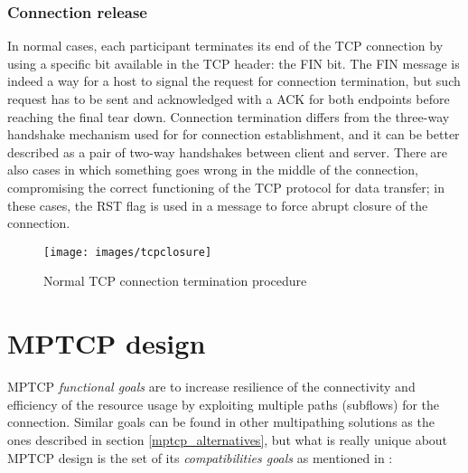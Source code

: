 \subsubsection{Connection release}
In normal cases, each participant terminates its end of the TCP connection by using a specific bit available in the TCP header: the FIN bit. The FIN message is indeed a way for a host to signal the request for connection termination, but such request has to be sent and acknowledged with a ACK for both endpoints before reaching the final tear down. Connection termination differs from the three-way handshake mechanism used for for connection establishment, and it can be better described as a pair of two-way handshakes between client and server.
There are also cases in which something goes wrong in the middle of the connection, compromising the correct functioning of the TCP protocol for data transfer; in these cases, the RST flag is used in a message to force abrupt closure of the connection.
 
\begin{figure}[!htb]
\centering
\texttt{[image: images/tcpclosure]}
\caption{Normal TCP connection termination procedure}
\label{fig:tcpclosure}
\end{figure}

\section{MPTCP design}
\label{mptcpdesign}
MPTCP \textit{functional goals} are to increase resilience of the connectivity and efficiency of the resource usage by exploiting multiple paths (subflows) for the connection.
Similar goals can be found in other multipathing solutions as the ones described in section \ref{mptcp_alternatives}, but what is really unique about MPTCP design is the set of its \textit{compatibilities goals} as mentioned in :

